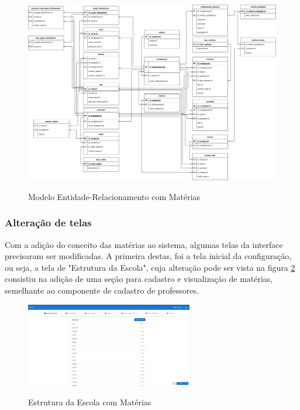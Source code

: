 \begin{figure}[!htb]
	\centering
	\caption{Modelo Entidade-Relacionamento com Matérias}
	\includegraphics[width=1\textwidth]{./dados/figuras/ER_horario_INCREMENTO6}
	\label{fig:modelagemMateiras}
\end{figure}
\pagebreak

\subsubsection{Alteração de telas}
Com a adição do conceito das matérias ao sistema, algumas telas da interface precisaram ser modificadas. A primeira destas, foi a tela inicial da configuração, ou seja, a tela de "Estrutura da Escola", cuja alteração pode ser vista na figura \ref{fig:estruturaAtualizada} consistiu na adição de uma seção para cadastro e visualização de matérias, semelhante ao componente de cadastro de professores.

\begin{figure}[!htb]
	\centering
	\caption{Estrutura da Escola com Matérias}
	\includegraphics[width=0.65\textwidth]{./dados/figuras/alteracaoEstrutura}
	\label{fig:estruturaAtualizada}
\end{figure}
\pagebreak

